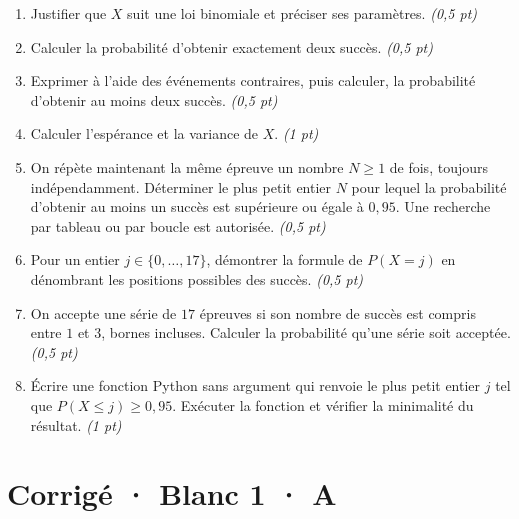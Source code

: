 \begin{enumerate}

\item Justifier que $X$ suit une loi binomiale et préciser ses paramètres. \hfill\textit{(0,5 pt)}

\item Calculer la probabilité d'obtenir exactement deux succès. \hfill\textit{(0,5 pt)}

\item Exprimer à l'aide des événements contraires, puis calculer, la probabilité d'obtenir au moins deux succès. \hfill\textit{(0,5 pt)}

\item Calculer l'espérance et la variance de $X$. \hfill\textit{(1 pt)}

\item On répète maintenant la même épreuve un nombre $N\ge1$ de fois, toujours indépendamment. Déterminer le plus petit entier $N$ pour lequel la probabilité d'obtenir au moins un succès est supérieure ou égale à $0{,}95$. Une recherche par tableau ou par boucle est autorisée. \hfill\textit{(0,5 pt)}

\item Pour un entier $j\in\{0,\ldots,17\}$, démontrer la formule de $P(X=j)$ en dénombrant les positions possibles des succès. \hfill\textit{(0,5 pt)}

\item On accepte une série de $17$ épreuves si son nombre de succès est compris entre $1$ et $3$, bornes incluses. Calculer la probabilité qu'une série soit acceptée. \hfill\textit{(0,5 pt)}

\item Écrire une fonction Python sans argument qui renvoie le plus petit entier $j$ tel que $P(X\le j)\ge0{,}95$. Exécuter la fonction et vérifier la minimalité du résultat. \hfill\textit{(1 pt)}

\end{enumerate}

\ifprof\clearpage

\section*{Corrigé · Blanc 1 · A}\label{cor:5-3}

